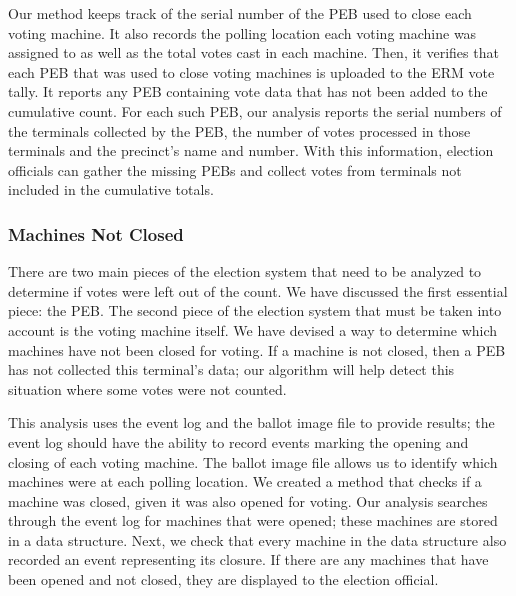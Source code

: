 Our method keeps track of the serial number of the PEB used to close each voting machine. It also records the polling location each voting machine was assigned to as well as the total votes cast in each machine. Then,  it verifies that each PEB that was used to close voting machines is uploaded to the ERM vote tally. It reports any PEB containing vote data that has not been added to the cumulative count.  For each such PEB, our analysis reports the serial numbers of the terminals collected by the PEB, the number of votes processed in those terminals and the precinct's name and number. With this information, election officials can gather the missing PEBs and collect votes from terminals not included in the cumulative totals.

\subsubsection{Machines Not Closed}
There are two main pieces of the election system that need to be analyzed to determine if votes were left out of the count.  We have discussed the first essential piece: the PEB.  The second piece of the election system that must be taken into account is the voting machine itself.   We have devised a way to determine which machines have not been closed for voting.  If a machine is not closed, then a PEB has not collected this terminal's data; our algorithm will help detect this situation where some votes were not counted.  

This analysis uses the event log and the ballot image file to provide results; the event log should have the ability to record events marking the opening and closing of each voting machine.  The ballot image file allows us to identify which machines were at each polling location.  We created a method that checks if a machine was closed, given it was also opened for voting.  Our analysis searches through the event log for machines that were opened; these machines are stored in a data structure.  Next, we check that every machine in the data structure also recorded an event representing its closure.  If there are any machines that have been opened and not closed, they are displayed to the election official.   
